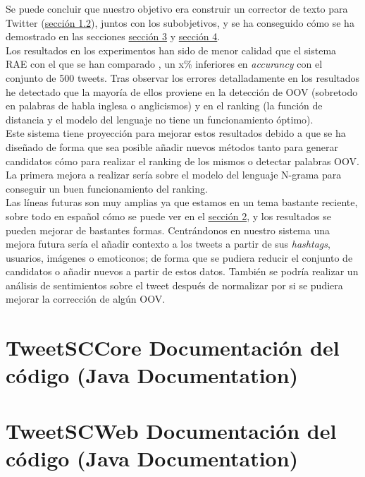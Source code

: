 \documentclass[spanish,12pt, a4paper,twoside]{paper}
\let\oldsection\section
\def\section{\cleardoublepage\oldsection}
\begin{document}
Se puede concluir que nuestro objetivo era construir un corrector de texto para Twitter (\hyperref[sec:objetivos]{sección 1.2}), juntos con los subobjetivos, y se ha conseguido cómo se ha demostrado en las secciones \hyperref[sec:solucionpropuesta]{sección 3} y \hyperref[sec:implementacion]{sección 4}.\\

Los resultados en los experimentos han sido de menor calidad que el sistema RAE con el que se han comparado \cite{porta:2013}, un x\% inferiores en \textit{accurancy} con el conjunto de 500 tweets. Tras observar los errores detalladamente en los resultados he detectado que la mayoría de ellos proviene en la detección de OOV (sobretodo en palabras de habla inglesa o anglicismos) y en el ranking (la función de distancia y el modelo del lenguaje no tiene un funcionamiento óptimo).\\

Este sistema tiene proyección para mejorar estos resultados debido a que se ha diseñado de forma que sea posible añadir nuevos métodos tanto para generar candidatos cómo para realizar el ranking de los mismos o detectar palabras OOV. La primera mejora a realizar sería sobre el modelo del lenguaje N-grama para conseguir un buen funcionamiento del ranking.\\

Las líneas futuras son muy amplias ya que estamos en un tema bastante reciente, sobre todo en español cómo se puede ver en el \hyperref[sec:estadodelarte]{sección 2}, y los resultados se pueden mejorar de bastantes formas. Centrándonos en nuestro sistema una mejora futura sería el añadir contexto a los tweets a partir de sus \textit{hashtags}, usuarios, imágenes o emoticonos; de forma que se pudiera reducir el conjunto de candidatos o añadir nuevos a partir de estos datos. También se podría realizar un análisis de sentimientos sobre el tweet después de normalizar por si se pudiera mejorar la corrección de algún OOV.

\section{TweetSCCore Documentación del código (Java Documentation)}\label{sec:tweetsccorejavadoc}


\section{TweetSCWeb Documentación del código (Java Documentation)}\label{sec:tweetscwebjavadoc}

\end{document}
